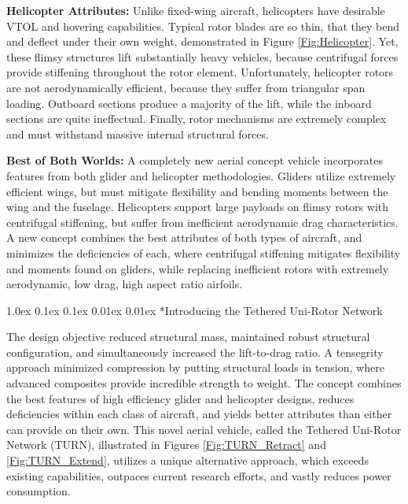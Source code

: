 \documentclass[11pt]{article}
\makeatletter
\renewcommand\subsection{
\@startsection{subsection}{2}{\z@}%
{1.0ex \@plus 0.1ex \@minus 0.1ex}%
{0.01ex \@plus 0.01ex}%
{\normalfont\Large\bfseries}}
\makeatother
\begin{document}
{\bf Helicopter Attributes:}
Unlike fixed-wing aircraft, helicopters have desirable VTOL and hovering capabilities.  Typical rotor blades are so thin, that they bend and deflect under their own weight, demonstrated in Figure \ref{Fig:Helicopter}.  Yet, these flimsy structures lift substantially heavy vehicles, because centrifugal forces provide stiffening throughout the rotor element.  Unfortunately, helicopter rotors are not aerodynamically efficient, because they suffer from triangular span loading.  Outboard sections produce a majority of the lift, while the inboard sections are quite ineffectual.  Finally, rotor mechanisms are extremely complex and must withstand massive internal structural forces.


{\bf Best of Both Worlds:}
A completely new aerial concept vehicle incorporates features from both glider and helicopter methodologies.  Gliders utilize extremely efficient wings, but must mitigate flexibility and bending moments between the wing and the fuselage.  Helicopters support large payloads on flimsy rotors with centrifugal stiffening, but suffer from inefficient aerodynamic drag characteristics.  A new concept combines the best attributes of both types of aircraft, and minimizes the deficiencies of each, where centrifugal stiffening mitigates flexibility and moments found on gliders, while replacing inefficient rotors with extremely aerodynamic, low drag, high aspect ratio airfoils.




\subsection*{Introducing the Tethered Uni-Rotor Network}

The design objective reduced structural mass, maintained robust structural configuration, and simultaneously increased the lift-to-drag ratio.  A tensegrity approach minimized compression by putting structural loads in tension, where advanced composites provide incredible strength to weight.  The concept combines the best features of high efficiency glider and helicopter designs, reduces deficiencies within each class of aircraft, and yields better attributes than either can provide on their own.  This novel aerial vehicle, called the Tethered Uni-Rotor Network (TURN), illustrated in Figures \ref{Fig:TURN_Retract} and \ref{Fig:TURN_Extend}, utilizes a unique alternative approach, which exceeds existing capabilities, outpaces current research efforts, and vastly reduces power consumption.
\end{document}
